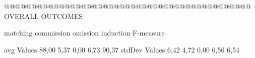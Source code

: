  @@@@@@@@@@@@@@@@@@@@@@@@@@@@@@@@@@@@@@@@@@@@@ OVERALL OUTCOMES

            matching commission   omission  induction  F-measure

avg Values      88,00    5,37       0,00      6,73       90,37       
stdDev Values    6,42    4,72       0,00      6,56        6,54       
